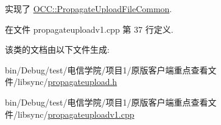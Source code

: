 实现了 \hyperlink{class_o_c_c_1_1_propagate_upload_file_common_a7df70722c1bc35b534d7cd1829abe8f5}{O\+C\+C\+::\+Propagate\+Upload\+File\+Common}.



在文件 propagateuploadv1.\+cpp 第 37 行定义.



该类的文档由以下文件生成\+:\begin{DoxyCompactItemize}
\item 
bin/\+Debug/test/电信学院/项目1/原版客户端重点查看文件/libsync/\hyperlink{propagateupload_8h}{propagateupload.\+h}\item 
bin/\+Debug/test/电信学院/项目1/原版客户端重点查看文件/libsync/\hyperlink{propagateuploadv1_8cpp}{propagateuploadv1.\+cpp}\end{DoxyCompactItemize}
